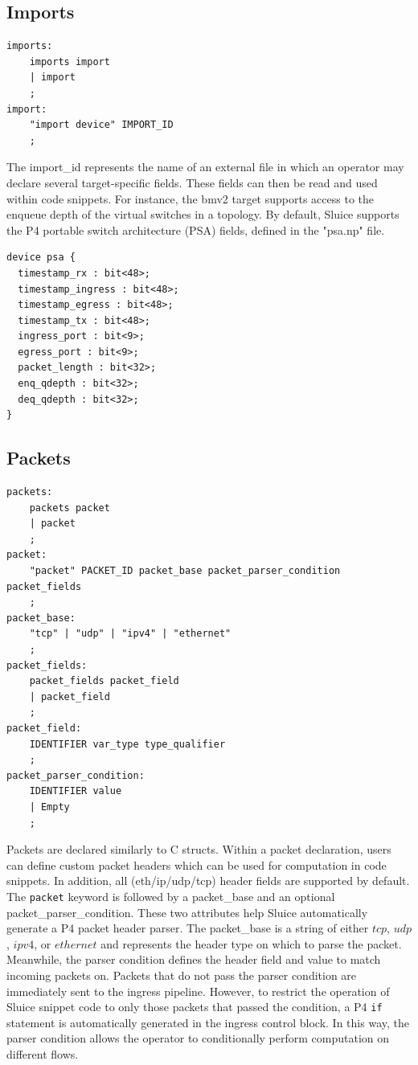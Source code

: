 \documentclass[12pt, oneside]{article}
\begin{document}
\subsection{Imports}
\begin{lstlisting}[basicstyle=\linespread{1.3}\scriptsize,  numberstyle=\tiny, backgroundcolor = \color{teagreen}, frame=tlrb]
imports:
	imports import
	| import
	;
import:
	"import device" IMPORT_ID
	;
\end{lstlisting}

The import\_id represents the name of an external file in which an operator may declare several target-specific fields. These fields can then be read and used within code snippets. For instance, the bmv2 target supports access to the enqueue depth of the virtual switches in a topology. By default, Sluice supports the P4 portable switch architecture (PSA) fields, defined in the "psa.np" file. 

\begin{lstlisting}[basicstyle=\linespread{1.3}\scriptsize]
device psa {
  timestamp_rx : bit<48>;
  timestamp_ingress : bit<48>;
  timestamp_egress : bit<48>;
  timestamp_tx : bit<48>;
  ingress_port : bit<9>;
  egress_port : bit<9>;
  packet_length : bit<32>;
  enq_qdepth : bit<32>;
  deq_qdepth : bit<32>;
}
\end{lstlisting}



\subsection{Packets}
\begin{lstlisting}[basicstyle=\linespread{1.3}\scriptsize,  numberstyle=\tiny, backgroundcolor = \color{teagreen}, frame=tlrb]
packets:
	packets packet
	| packet
	;
packet:
	"packet" PACKET_ID packet_base packet_parser_condition packet_fields
	;
packet_base:
	"tcp" | "udp" | "ipv4" | "ethernet"
	;
packet_fields:
	packet_fields packet_field
	| packet_field
	;
packet_field:
	IDENTIFIER var_type type_qualifier
	;
packet_parser_condition:
	IDENTIFIER value
	| Empty
	;
\end{lstlisting}

Packets are declared similarly to C structs. Within a packet declaration, users can define custom packet headers which can be used for computation in code snippets. In addition, all (eth/ip/udp/tcp) header fields are supported by default. The \texttt{packet} keyword is followed by a packet\_base and an optional packet\_parser\_condition. These two attributes help Sluice automatically generate a P4 packet header parser. The packet\_base is a string of either $tcp$, $udp$, $ipv4$, or $ethernet$ and represents the header type on which to parse the packet.  Meanwhile, the parser condition defines the header field and value to match incoming packets on. Packets that do not pass the parser condition are immediately sent to the ingress pipeline. However, to restrict the operation of Sluice snippet code to only those packets that passed the condition, a P4 \texttt{if} statement is automatically generated in the ingress control block. In this way, the parser condition allows the operator to conditionally perform computation on different flows.
\end{document}
